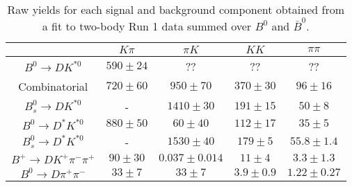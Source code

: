 \begin{table}
  \centering
  \begin{tabular}{ccccc}
      \toprule
       & $K\pi$ & $\pi K$ & $KK$ & $\pi\pi$ \\
      \midrule
      $B^0 \to DK^{*0}$ & $590 \pm 24$ & ?? & ?? & ?? \\
      Combinatorial & $720 \pm 60$ & $950 \pm 70$ & $370 \pm 30$ & $96 \pm 16$ \\
      $B^0_s \to DK^{*0}$ & \-- & $1410 \pm 30$ & $191 \pm 15$ & $50 \pm 8$ \\
      $B^0 \to D^*K^{*0}$ & $880 \pm 50$ & $60 \pm 40$ & $112 \pm 17$ & $35 \pm 5$ \\
      $B^0_s \to D^*K^{*0}$ & \-- & $1530 \pm 40$ & $179 \pm 5$ & $55.8 \pm 1.4$ \\
      $B^+ \to DK^+\pi^-\pi^+$ & $90 \pm 30$ & $0.037 \pm 0.014$ & $11 \pm 4$ & $3.3 \pm 1.3$ \\
      $B^0 \to D\pi^+\pi^-$ & $33 \pm 7$ & $33 \pm 7$ & $3.9 \pm 0.9$ & $1.22 \pm 0.27$ \\
      \bottomrule
      \end{tabular}
  \caption{Raw yields for each signal and background component obtained from a fit to two-body Run 1 data summed over $B^0$ and $\bar{B}^0$.}
\label{tab:yields_combined_2body_run1}
\end{table}
